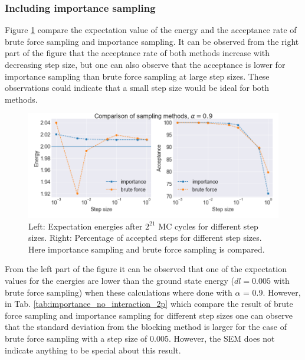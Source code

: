 \subsubsection{Including importance sampling}

Figure \ref{fig:comparing_sampling} compare the expectation value of the energy and the acceptance rate of brute force sampling and importance sampling. It can be observed from the right part of the figure that the acceptance rate of both methods increase with decreasing step size, but one can also observe that the acceptance is lower for importance sampling than brute force sampling at large step sizes. These observations could indicate that a small step size would be ideal for both methods. 

\begin{figure}[H]
\center
\includegraphics[width=0.85\linewidth]{../Results/comparing_sampling}\caption{Left: Expectation energies after $2^{21}$ MC cycles for different step sizes. Right: Percentage of accepted steps for different step sizes. Here importance sampling and brute force sampling is compared. }\label{fig:comparing_sampling}
\end{figure}


From the left part of the figure it can be observed that one of the expectation values for the energies are lower than the ground state energy ($dl = 0.005$ with brute force sampling) when these calculations where done with $\alpha$ = 0.9. However, in Tab. \ref{tab:importance_no_interaction_2p} which compare the result of brute force sampling and importance sampling for different step sizes one can observe that the standard deviation from the blocking method is larger for the case of brute force sampling with a step size of 0.005. However,  the SEM does not indicate anything to be special about this result.

